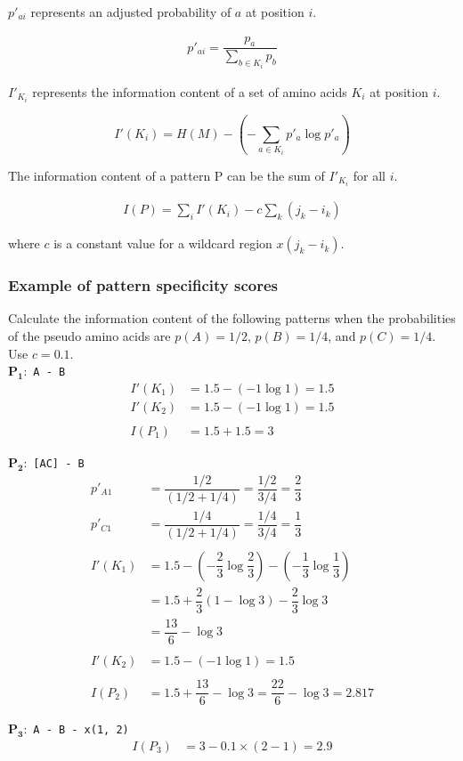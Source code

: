\noindent
$p\prime_{ai}$ represents an adjusted probability of $a$ at position $i$.

\begin{align*}
p'_{ai} = \dfrac{p_a}{\sum_{b \in K_i} p_b} 
\end{align*}

\noindent
$I'_{K_i}$ represents the information content of a set of amino acids $K_i$ at position $i$. 

\[
I'(K_i) = H(M) - \left (-\sum_{a \in K_i}  p'_{a} \log⁡ p'_a \right )	
\]

\noindent
The information content of a pattern P can be the sum of $I'_{K_i}$ for all $i$.

\begin{align*}
I(P)=\sum_{i} I'(K_i) - c \sum_{k} (j_k - i_k)	
\end{align*}

\begin{center}
where $c$ is a constant value for a wildcard region $x(j_k - i_k)$.
\end{center}

%
%
\subsubsection*{Example of pattern specificity scores}
Calculate the information content of the following patterns when the probabilities of the pseudo amino acids are $p(A)=1/2$, $p(B)=1/4$, and $p(C)=1/4$. Use $c = 0.1$. \\

$\mathbf{P_1:}$ \verb|A - B|
\begin{align*}
I'(K_1) &= 1.5 - (-1 \log⁡1) = 1.5 \\
I'(K_2) &= 1.5 - (-1 \log⁡1) = 1.5 \\ \\
I(P_1) &= 1.5 + 1.5 = 3
\end{align*}

$\mathbf{P_2:}$ \verb|[AC] - B|
\begin{align*}
p'_{A1} &= \dfrac{1/2}{(1/2+1/4)} = \dfrac{1/2}{3/4} = \dfrac{2}{3} \\
p'_{C1} &= \dfrac{1/4}{(1/2+1/4)} = \dfrac{1/4}{3/4} = \dfrac{1}{3} \\ \\
I'(K_1) &= 1.5 - \left (-\dfrac{2}{3} \log⁡ \dfrac{2}{3} \right) -  \left (-\dfrac{1}{3} \log⁡ \dfrac{1}{3} \right)  \\
 &= 1.5 + \dfrac{2}{3} ( 1 - \log⁡3) - \dfrac{2}{3}  \log⁡3 \\
 &=\dfrac{13}{6} - \log3 \\ \\
I'(K_2) &= 1.5 - (-1 \log⁡1) = 1.5 \\ \\
I(P_2) &= 1.5 + \dfrac{13}{6} - \log3 = \dfrac{22}{6} - \log3 = 2.817
\end{align*}

$\mathbf{P_3:}$ \verb|A - B - x(1, 2)|
\begin{align*}
I(P_3) &= 3 - 0.1 \times (2 - 1) = 2.9
\end{align*}

\bigskip 

%
